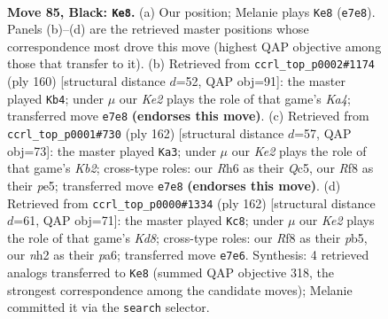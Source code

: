 \documentclass[11pt]{article}
\begin{document}
\clearpage

\begin{figure}[p]\centering
\begin{subfigure}{0.46\textwidth}\centering
\resizebox{\linewidth}{!}{%
\newchessgame
\chessboard[
  setfen={5r2/pQ2k1p1/7r/q6P/3P4/4P3/7N/4b2K b - - 5 85},
  showmover=false,
  pgfstyle=straightmove, color=movearrow, markmove={e7-e8}
]}
\caption{}
\end{subfigure}\hfill
\begin{subfigure}{0.46\textwidth}\centering
\resizebox{\linewidth}{!}{%
\newchessgame
\chessboard[
  setfen={1r6/1P4k1/2Q3p1/1R3p2/K7/3P4/8/q7 w - - 10 81},
  showmover=false,
  pgfstyle=straightmove, color=movearrow, markmove={a4-b4}
]}
\caption{}
\end{subfigure}
\\[4pt]
\begin{subfigure}{0.46\textwidth}\centering
\resizebox{\linewidth}{!}{%
\newchessgame
\chessboard[
  setfen={5k2/2R3p1/3n2p1/2Q1p3/1P6/8/1K2q3/8 w - - 39 82},
  showmover=false,
  pgfstyle=straightmove, color=movearrow, markmove={b2-a3}
]}
\caption{}
\end{subfigure}\hfill
\begin{subfigure}{0.46\textwidth}\centering
\resizebox{\linewidth}{!}{%
\newchessgame
\chessboard[
  setfen={3K4/5Rpk/p3Qn2/1p6/3q2P1/8/8/8 w - - 5 82},
  showmover=false,
  pgfstyle=straightmove, color=movearrow, markmove={d8-c8}
]}
\caption{}
\end{subfigure}
\caption{\textbf{Move 85, Black: \texttt{Ke8}.} (a) Our position; Melanie plays \texttt{Ke8} (\texttt{e7e8}). Panels (b)--(d) are the retrieved master positions whose correspondence most drove this move (highest QAP objective among those that transfer to it). (b) Retrieved from \texttt{ccrl\_top\_p0002\#1174} (ply 160) [structural distance $d$=52, QAP obj=91]: the master played \texttt{Kb4}; under $\mu$ our \emph{Ke2} plays the role of that game's \emph{Ka4}; transferred move \texttt{e7e8} \textbf{(endorses this move)}. (c) Retrieved from \texttt{ccrl\_top\_p0001\#730} (ply 162) [structural distance $d$=57, QAP obj=73]: the master played \texttt{Ka3}; under $\mu$ our \emph{Ke2} plays the role of that game's \emph{Kb2}; cross-type roles: our \emph{R}h6 as their \emph{Q}c5, our \emph{R}f8 as their \emph{p}e5; transferred move \texttt{e7e8} \textbf{(endorses this move)}. (d) Retrieved from \texttt{ccrl\_top\_p0000\#1334} (ply 162) [structural distance $d$=61, QAP obj=71]: the master played \texttt{Kc8}; under $\mu$ our \emph{Ke2} plays the role of that game's \emph{Kd8}; cross-type roles: our \emph{R}f8 as their \emph{p}b5, our \emph{n}h2 as their \emph{p}a6; transferred move \texttt{e7e6}. Synthesis: 4 retrieved analogs transferred to \texttt{Ke8} (summed QAP objective 318, the strongest correspondence among the candidate moves); Melanie committed it via the \texttt{search} selector.}
\label{fig:thought-m169}
\end{figure}
\end{document}
